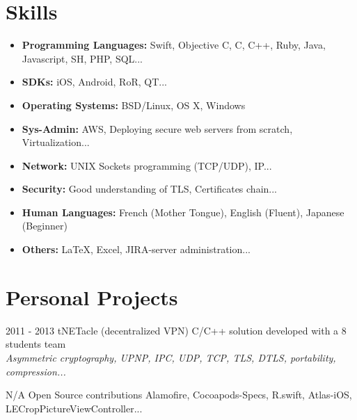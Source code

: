 \documentclass[]{template/friggeri-cv} %
\begin{document}

\section{Skills}

\begin{itemize}
\item \textbf{Programming Languages:} Swift, Objective C, C, C++, Ruby, Java, Javascript, SH, PHP, SQL...
\item \textbf{SDKs:} iOS, Android, RoR, QT...
\item \textbf{Operating Systems:} BSD/Linux, OS X, Windows
\item \textbf{Sys-Admin:} AWS, Deploying secure web servers from scratch, Virtualization...
\item \textbf{Network:} UNIX Sockets programming (TCP/UDP), IP...
\item \textbf{Security:} Good understanding of TLS, Certificates chain...
\item \textbf{Human Languages:} French (Mother Tongue), English (Fluent), Japanese (Beginner)
\item \textbf{Others:} \LaTeX, Excel, JIRA-server administration...
\end{itemize}


\section{Personal Projects}
\begin{entrylist}
  \entry
      {2011 - 2013}
      {tNETacle (decentralized VPN)}
      {}
      {C/C++ solution developed with a 8 students team \\
      \emph{Asymmetric cryptography, UPNP, IPC, UDP, TCP, TLS, DTLS, portability, compression...}}

\entry
{N/A}
{Open Source contributions}
{}
{Alamofire, Cocoapods-Specs, R.swift, Atlas-iOS, LECropPictureViewController...}


\end{entrylist}
\end{document}
